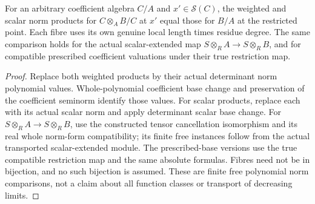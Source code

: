 \begin{theorem}
\label{spectrum:finite-free-norm-products-base-change}
\leanok
{}
For an arbitrary coefficient algebra $C/A$ and $x'\in\mathcal S(C)$, the
weighted and scalar norm products for $C\otimes_AB/C$ at $x'$ equal those
for $B/A$ at the restricted point. Each fibre uses its own genuine local
length times residue degree. The same comparison holds for the actual
scalar-extended map $S\otimes_R A\to S\otimes_R B$, and for compatible
prescribed coefficient valuations under their true restriction map.
\end{theorem}
\begin{proof}
Replace both weighted products by their actual determinant norm polynomial
values. Whole-polynomial coefficient base change and preservation of the
coefficient seminorm identify those values. For scalar products, replace
each with its actual scalar norm and apply determinant scalar base change.
For $S\otimes_R A\to S\otimes_R B$, use the constructed tensor cancellation
isomorphism and its real whole norm-form compatibility; its finite free
instances follow from the actual transported scalar-extended module.
The prescribed-base versions use the true compatible restriction map and
the same absolute formulas. Fibres need not be in bijection, and no such
bijection is assumed. These are finite free polynomial norm comparisons,
not a claim about all function classes or transport of decreasing limits.
\end{proof}
